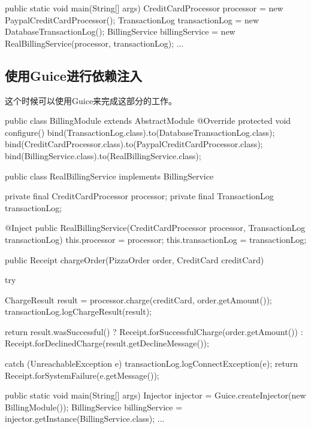 \begin{Java}
  public static void main(String[] args) {
    CreditCardProcessor processor = new PaypalCreditCardProcessor();
    TransactionLog transactionLog = new DatabaseTransactionLog();
    BillingService billingService
        = new RealBillingService(processor, transactionLog);
    ...
  }
\end{Java}

\subsection{使用Guice进行依赖注入}

这个时候可以使用Guice来完成这部分的工作。

\begin{Java}[通过configure来指定如果生成对象]
public class BillingModule extends AbstractModule {
  @Override 
  protected void configure() {
    bind(TransactionLog.class).to(DatabaseTransactionLog.class);
    bind(CreditCardProcessor.class).to(PaypalCreditCardProcessor.class);
    bind(BillingService.class).to(RealBillingService.class);
  }
}
\end{Java}


\begin{Java}
public class RealBillingService implements BillingService {
  private final CreditCardProcessor processor;
  private final TransactionLog transactionLog;

  @Inject
  public RealBillingService(CreditCardProcessor processor,
      TransactionLog transactionLog) {
    this.processor = processor;
    this.transactionLog = transactionLog;
  }

  public Receipt chargeOrder(PizzaOrder order, CreditCard creditCard) {
    try {
      ChargeResult result = processor.charge(creditCard, order.getAmount());
      transactionLog.logChargeResult(result);

      return result.wasSuccessful()
          ? Receipt.forSuccessfulCharge(order.getAmount())
          : Receipt.forDeclinedCharge(result.getDeclineMessage());
     } catch (UnreachableException e) {
      transactionLog.logConnectException(e);
      return Receipt.forSystemFailure(e.getMessage());
    }
  }
}
\end{Java}

\begin{Java}[这样在顶层只需要这样]
  public static void main(String[] args) {
    Injector injector = Guice.createInjector(new BillingModule());
    BillingService billingService = injector.getInstance(BillingService.class);
    ...
  }
\end{Java}


